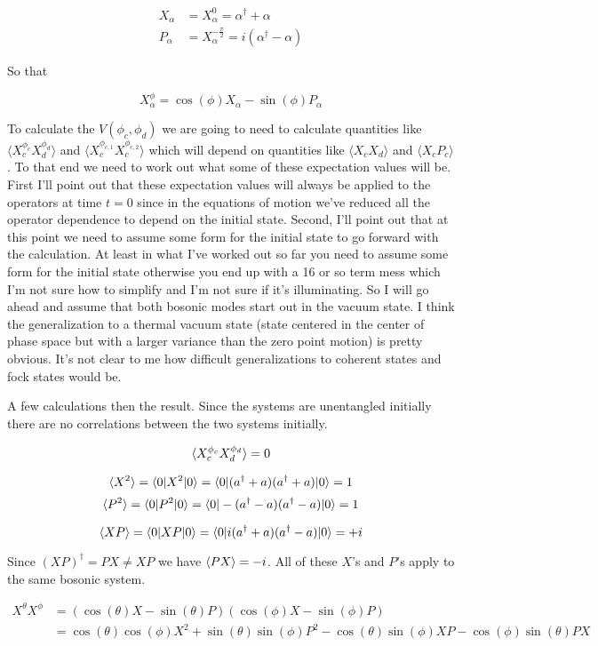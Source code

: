 \documentclass[12pt]{article}
\begin{document}
\begin{align*}
X_{\alpha} &= X_{\alpha}^{0} = \alpha^{\dag} + \alpha\\
P_{\alpha} &= X_{\alpha}^{-\frac{\pi}{2}} = i(\alpha^{\dag} - \alpha)
\end{align*}

So that

\[
X_{\alpha}^{\phi} = \cos(\phi) X_{\alpha} - \sin(\phi) P_{\alpha}
\]

To calculate the $V(\phi_c,\phi_d)$ we are going to need to calculate quantities like $\langle X_{c}^{\phi_c} X_{d}^{\phi_d}\rangle$ and $\langle X_{c}^{\phi_{c,1}} X_{c}^{\phi_{c,2}}\rangle$ which will depend on quantities like $\langle X_c X_d \rangle$ and $\langle X_c P_c \rangle$. To that end we need to work out what some of these expectation values will be. First I'll point out that these expectation values will always be applied to the operators at time $t=0$ since in the equations of motion we've reduced all the operator dependence to depend on the initial state. Second, I'll point out that at this point we need to assume some form for the initial state to go forward with the calculation. At least in what I've worked out so far you need to assume some form for the initial state otherwise you end up with a 16 or so term mess which I'm not sure how to simplify and I'm not sure if it's illuminating. So I will go ahead and assume that both bosonic modes start out in the vacuum state. I think the generalization to a thermal vacuum state (state centered in the center of phase space but with a larger variance than the zero point motion) is pretty obvious. It's not clear to me how difficult generalizations to coherent states and fock states would be.

A few calculations then the result.
Since the systems are unentangled initially there are no correlations between the two systems initially.

\[ \braket{X_c^{\phi_c} X_d^{\phi_d}}=0 \]

\[ \braket{X^2} = \braket{0|X^2|0}=\braket{0|(a^{\dag}+a)(a^{\dag}+a)|0} = 1\]
\[\braket{P^2} = \braket{0|P^2|0} = \braket{0|-(a^{\dag}-a)(a^{\dag}-a)|0} = 1 \]

\[\braket{XP} = \braket{0|XP|0} = \braket{0|i(a^{\dag}+a)(a^{\dag}-a)|0} = +i\]

Since $(XP)^{\dag} = PX \neq XP$ we have $\braket{PX} = -i$. All of these $X$'s and $P$'s apply to the same bosonic system.

\begin{align*}
X^{\theta} X^{\phi} &= \left(\cos(\theta) X - \sin(\theta)P\right)\left(\cos(\phi)X - \sin(\phi) P\right)\\
&= \cos(\theta)\cos(\phi)X^2 + \sin(\theta)\sin(\phi)P^2 - \cos(\theta)\sin(\phi) XP - \cos(\phi)\sin(\theta) PX
\end{align*}
\end{document}
